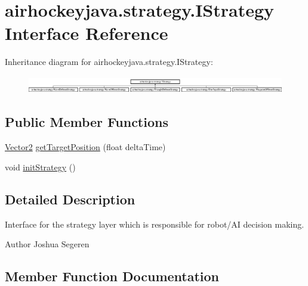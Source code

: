 \hypertarget{interfaceairhockeyjava_1_1strategy_1_1_i_strategy}{}\section{airhockeyjava.\+strategy.\+I\+Strategy Interface Reference}
\label{interfaceairhockeyjava_1_1strategy_1_1_i_strategy}
Inheritance diagram for airhockeyjava.\+strategy.\+I\+Strategy\+:\begin{figure}[H]
\begin{center}
\leavevmode
\includegraphics[height=0.754209cm]{interfaceairhockeyjava_1_1strategy_1_1_i_strategy}
\end{center}
\end{figure}
\subsection*{Public Member Functions}
\begin{DoxyCompactItemize}
\item 
\hyperlink{classairhockeyjava_1_1util_1_1_vector2}{Vector2} \hyperlink{interfaceairhockeyjava_1_1strategy_1_1_i_strategy_a210029614aca3e2d2f344d0b5fa600be}{get\+Target\+Position} (float delta\+Time)
\item 
void \hyperlink{interfaceairhockeyjava_1_1strategy_1_1_i_strategy_a28eb187bf61ef4bbd7d152f5856ce857}{init\+Strategy} ()
\end{DoxyCompactItemize}


\subsection{Detailed Description}
Interface for the strategy layer which is responsible for robot/\+A\+I decision making.

\begin{DoxyAuthor}{Author}
Joshua Segeren 
\end{DoxyAuthor}


\subsection{Member Function Documentation}
\hypertarget{interfaceairhockeyjava_1_1strategy_1_1_i_strategy_a210029614aca3e2d2f344d0b5fa600be}{}
